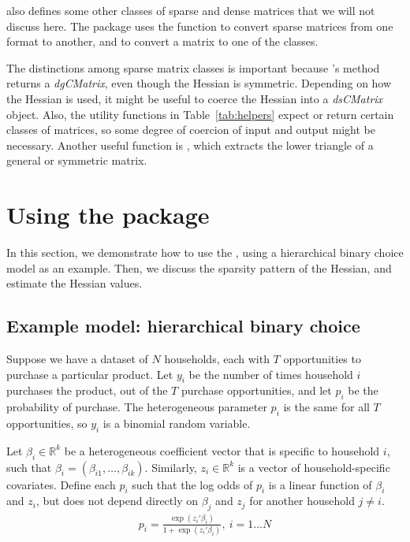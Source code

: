 \documentclass[jss]{jss}\usepackage[]{graphicx}\usepackage[]{color}
\newcommand{\func}[1]{\code{#1}}
\newcommand{\class}[1]{\textsl{#1}}
\newcommand{\method}[1]{\func{#1}}
\newcommand{\Real}[1]{\mathbb{R}^{#1}}
\begin{document}
 also defines some other classes of
sparse and dense matrices that we will not discuss here. The
 package uses the \func{as} function to convert sparse
matrices from one format to another, and to convert a 
 matrix to one of the  classes.

The distinctions among sparse matrix classes is important because
's \method{hessian} method returns a
\class{dgCMatrix}, even though the Hessian is symmetric. Depending on how the
Hessian is used, it might be useful to coerce the Hessian into a
\class{dsCMatrix} object.  Also, the utility functions in Table~\ref{tab:helpers} expect or return certain classes of matrices, so
some degree of coercion of input and output might be
necessary. Another useful  function is \func{tril}, which
extracts the lower triangle of a general or symmetric matrix.


\section[Using the package]{Using the package}\label{sec:using}

In this section, we demonstrate how to use the ,
using a hierarchical binary choice model as an example.  Then, we
discuss the sparsity pattern of the Hessian, and estimate the Hessian values.

\subsection[Example: hierarchical binary choice]{Example model: hierarchical binary choice}\label{sec:example}

Suppose we have a dataset of $N$ households, each with $T$
 opportunities to purchase a particular product.  Let $y_i$ be the
 number of times household $i$ purchases the product, out of the $T$
 purchase opportunities, and let $p_i$ be the probability of
 purchase.  The heterogeneous parameter $p_i$ is the same for all $T$
 opportunities, so $y_i$ is a binomial random variable.

 Let $\beta_i\in\Real{k}$ be a heterogeneous coefficient vector that
 is specific to household $i$, such that
 $\beta_i=(\beta_{i1},\dotsc,\beta_{ik})$. Similarly,
 $z_i\in\Real{k}$ is a vector of household-specific covariates. Define each
 $p_i$ such that the log odds of $p_i$ is a linear function of
 $\beta_i$ and $z_i$, but does not depend directly on $\beta_j$ and $z_j$ for
 another household $j\neq i$.
\begin{align}
  p_i=\frac{\exp(z_i'\beta_i)}{1+\exp(z_i'\beta_i)},~i=1 ... N
\end{align}
\end{document}
